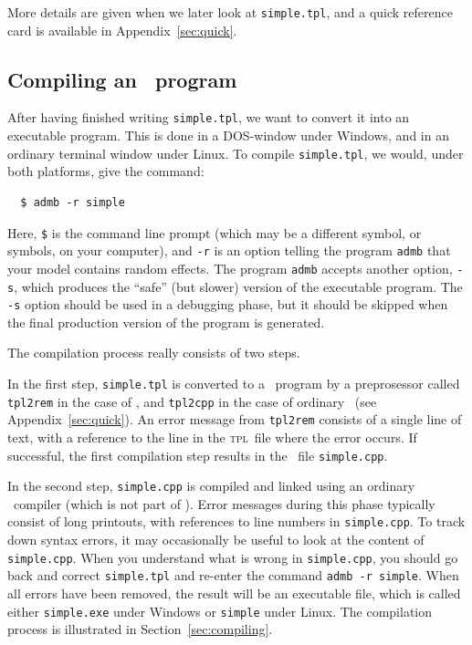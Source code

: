 \documentclass{admbmanual}
\begin{document}
More details are given when we later look at \texttt{simple.tpl}, and a quick
reference card is available in Appendix~\ref{sec:quick}.

\subsection{Compiling an \scAB\ program}

After having finished writing \texttt{simple.tpl}, we want to convert it into an
executable program. This is done in a \textsc{DOS}-window under Windows, and in
an ordinary terminal window under Linux. To compile \texttt{simple.tpl}, we
would, under both platforms, give the command:
\begin{lstlisting}
  $ admb -r simple
\end{lstlisting}
Here, \texttt{\$} is the command line prompt (which may be a different symbol,
or symbols, on your computer), and \texttt{-r} is an option telling the program
\texttt{admb} that your model contains random effects. The program \texttt{admb}
accepts another option, \texttt{-s}, which produces the ``safe'' (but slower)
version of the executable program. The \texttt{-s} option should be used in a
debugging phase, but it should be skipped when the final production version of
the program is generated.

The compilation process really consists of two steps.

In the first step, \texttt{simple.tpl} is converted to a \cplus\ program by a
preprosessor called \texttt{tpl2rem} in the case of \scAR, and \texttt{tpl2cpp}
in the case of ordinary \scAB\ (see Appendix~\ref{sec:quick}). An error message
from \texttt{tpl2rem} consists of a single line of text, with a reference to the
line in the \textsc{tpl}~file where the error occurs. If successful, the first
compilation step results in the \cplus\ file \texttt{simple.cpp}.

In the second step, \texttt{simple.cpp} is compiled and linked using an ordinary
\cplus\ compiler (which is not part of \scAB). Error messages during this phase
typically consist of long printouts, with references to line numbers in
\texttt{simple.cpp}. To track down syntax errors, it may occasionally be useful
to look at the content of \texttt{simple.cpp}. When you understand what is wrong
in \texttt{simple.cpp}, you should go back and correct \texttt{simple.tpl} and
re-enter the command \texttt{admb -r simple}. When all errors have been removed,
the result will be an executable file, which is called either
\texttt{simple.exe} under Windows or \texttt{simple} under Linux. The
compilation process is illustrated in Section~\ref{sec:compiling}.
\end{document}
